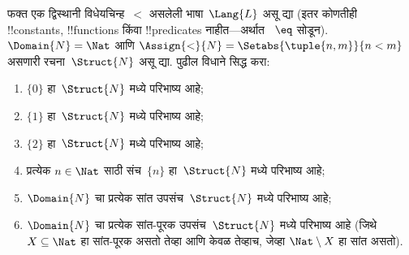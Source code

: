\documentclass[../../../include/open-logic-section]{subfiles}
\begin{document}
\begin{prob}
फक्त एक द्विस्थानी विधेयचिन्ह~$<$ असलेली भाषा~$\Lang{L}$ असू द्या (इतर
कोणतीही !!{constant}s, !!{function}s किंवा !!{predicate}s नाहीत---अर्थात
~$\eq$ सोडून). $\Domain{N} = \Nat$ आणि
$\Assign{<}{N} = \Setabs{\tuple{n,m}}{n < m}$ असणारी रचना~$\Struct{N}$
असू द्या. पुढील विधाने सिद्ध करा:
\begin{enumerate}
\item $\{ 0 \}$ हा~$\Struct{N}$ मध्ये परिभाष्य आहे;
\item $\{ 1 \}$ हा~$\Struct{N}$ मध्ये परिभाष्य आहे;
\item $\{ 2 \}$ हा~$\Struct{N}$ मध्ये परिभाष्य आहे;
\item प्रत्येक $n \in \Nat$ साठी संच~$\{ n \}$ हा~$\Struct{N}$ मध्ये
  परिभाष्य आहे;
\item $\Domain{N}$ चा प्रत्येक सांत उपसंच~$\Struct{N}$ मध्ये परिभाष्य आहे;
\item $\Domain{N}$ चा प्रत्येक सांत-पूरक उपसंच~$\Struct{N}$ मध्ये परिभाष्य
  आहे (जिथे $X \subseteq \Nat$ हा सांत-पूरक असतो तेव्हा आणि केवळ तेव्हाच,
  जेव्हा $\Nat \setminus X$ हा सांत असतो).
\end{enumerate}
\end{prob}
\end{document}
